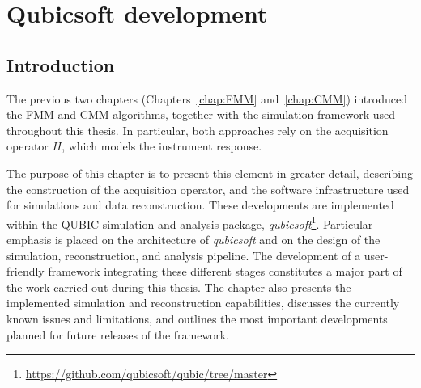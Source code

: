 \documentclass[../../thesis.tex]{subfiles}
\begin{document}
\chapter{Qubicsoft development}
\label{chap:qubicsoft}

\ifSubfilesClassLoaded{
\tableofcontents
}{
\minitoc
}

\section*{Introduction}

The previous two chapters (Chapters~\ref{chap:FMM} and~\ref{chap:CMM}) introduced the FMM and CMM algorithms, together with the simulation framework used throughout this thesis. In particular, both approaches rely on the acquisition operator $H$, which models the instrument response.

The purpose of this chapter is to present this element in greater detail, describing the construction of the acquisition operator, and the software infrastructure used for simulations and data reconstruction. These developments are implemented within the QUBIC simulation and analysis package, \emph{qubicsoft}\footnote{\url{https://github.com/qubicsoft/qubic/tree/master}}.
Particular emphasis is placed on the architecture of \emph{qubicsoft} and on the design of the simulation, reconstruction, and analysis pipeline. The development of a user-friendly framework integrating these different stages constitutes a major part of the work carried out during this thesis. 
The chapter also presents the implemented simulation and reconstruction capabilities, discusses the currently known issues and limitations, and outlines the most important developments planned for future releases of the framework.

\end{document}
